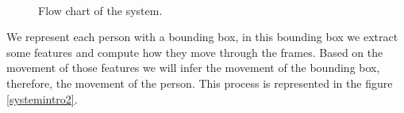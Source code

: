 \begin{figure}[H]
	
\centering

\\


\caption{Flow chart of the system.}
\label{introTracking3}
\end{figure}

We represent each person with a bounding box, in this bounding box we extract some features and compute how they move through the frames. Based on the movement of those features we will infer the movement of the bounding box, therefore, the movement of the person. This process is represented in the figure \ref{systemintro2}.


